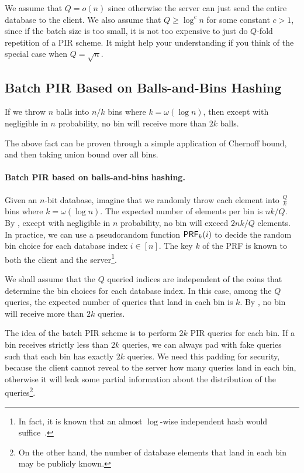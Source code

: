 We assume that $Q = o(n)$ since otherwise 
the server can just send the entire database to the client. 
We also assume that $Q \geq \log^c n$ for some constant $c > 1$, since if
the batch size is too small, 
it is not too expensive to just do $Q$-fold repetition of a PIR scheme. 
It might help your understanding if you think of the special 
case when $Q = \sqrt{n}$.
     
\subsection{Batch PIR Based on Balls-and-Bins Hashing}

\begin{fact}
If we throw 
$n$ balls into $n/k$ bins where $k = \omega(\log n)$,  
then except with negligible in $n$ probability, 
no bin will receive more than $2k$ balls.
\label{fct:ballsbins}
\end{fact}
The above fact can be proven through a simple application
of Chernoff bound, and then taking union bound over all bins.

\paragraph{Batch PIR based on balls-and-bins hashing.}
Given an $n$-bit database, imagine that we randomly throw each element
into $\frac{Q}{k}$ bins where %
$k = \omega(\log n)$.
The expected number of elements per bin is 
$n k /Q$. 
By ,
except with negligible in $n$ probability,
no bin will exceed $2 n k /Q$ elements.
In practice, we can use a pseudorandom function ${\sf PRF}_k(i)$
to decide the random bin 
choice for each database index $i \in [n]$. 
The key $k$ of the PRF is 
known to both the client and the server\footnote{In fact,
it is known that an almost 
$\log$-wise independent hash would suffice~\cite{logwise}.}.


We shall assume that the $Q$ queried indices are independent
of the coins that determine the bin choices for each database index.
In this case, among the $Q$ queries, 
 the expected number of queries  
that land in each bin 
is $k$. 
By , 
no bin will receive more than $2k$ queries.

The idea of the batch PIR scheme
is to perform $2k$ PIR queries for each bin.  
If a bin receives strictly less than $2k$ queries, we can always
pad with fake queries such that each bin has exactly $2k$ queries.
We need this padding for security, 
because the client cannot reveal  
to the server how many queries land in each bin, otherwise
it will leak some partial information about the 
distribution of the queries\footnote{On the other hand, the number of database elements
that land in each bin may be publicly known.}.


